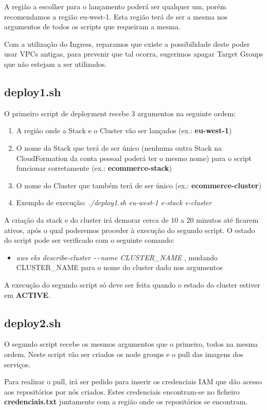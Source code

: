 \documentclass[11pt,a4paper]{article}
\begin{document}
A região a escolher para o lançamento poderá ser qualquer um, porém recomendamos a região eu-west-1. Esta região terá de ser a mesma nos argumentos de todos os scripts que requeiram a mesma.

Com a utilização do Ingress, reparamos que existe a possibilidade deste poder usar VPCs antigas, para prevenir que tal ocorra, sugerimos apagar Target Groups que não estejam a ser utilizados.

\subsection{deploy1.sh}
O primeiro script de deployment recebe 3 argumentos na seguinte ordem:
\begin{enumerate}
	\item A região onde a Stack e o Cluster vão ser lançados (ex.: \textbf{eu-west-1})
	\item O nome da Stack que terá de ser único (nenhuma outra Stack na CloudFormation da conta pessoal poderá ter o mesmo nome) para o script funcionar corretamente (ex.: \textbf{ecommerce-stack})
	\item O nome do Cluster que também terá de ser único (ex.: \textbf{ecommerce-cluster})
	\item Exemplo de execução: \textit{./deploy1.sh eu-west-1 e-stack e-cluster}
\end{enumerate}

A criação da stack e do cluster irá demorar cerca de 10 a 20 minutos até ficarem ativos, após o qual poderemos proceder à execução do segundo script. O estado do script pode ser verificado com o seguinte comando:
\begin{itemize}
	\item \textit{aws eks describe-cluster \texttt{-{}-}name CLUSTER\_NAME} , mudando CLUSTER\_NAME para o nome do cluster dado nos argumentos
\end{itemize}
A execução do segundo script só deve ser feita quando o estado do cluster estiver em \textbf{ACTIVE}.

\subsection{deploy2.sh}
O segundo script recebe os mesmos argumentos que o primeiro, todos na mesma ordem. Neste script vão ser criados os node groups e o pull das imagens dos serviços.

Para realizar o pull, irá ser pedido para inserir os credenciais IAM que dão acesso aos repositórios por nós criados. Estes credenciais encontram-se no ficheiro \textbf{credenciais.txt} juntamente com a região onde os repositórios se encontram.
\end{document}
